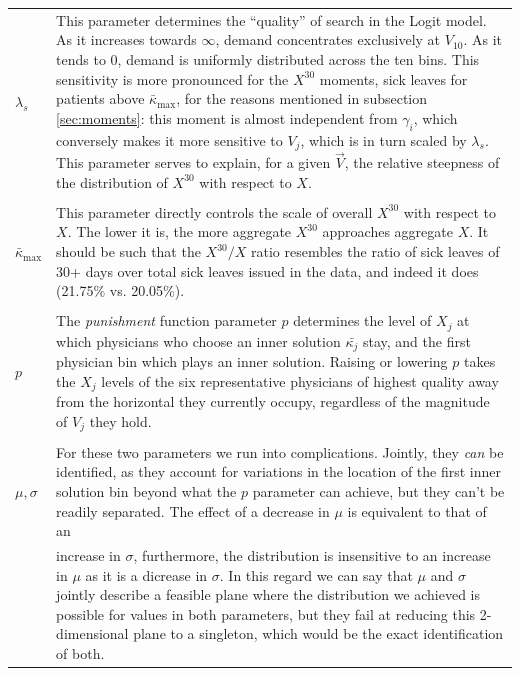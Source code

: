 \documentclass[../main.tex]{subfiles}
\begin{document}
\vspace{0.5em}
\begin{xltabular}{\textwidth}{lX}
  
  
    $\lambda_s$ & This parameter determines the ``quality'' of search in the Logit model. As it increases towards $\infty$, demand concentrates exclusively at $V_{10}$. As it tends to 0, demand is uniformly distributed across the ten bins. This sensitivity is more pronounced for the $X^{30}$ moments, sick leaves for patients above $\bar{\kappa}_{\max}$, for the reasons mentioned in subsection \ref{sec:moments}: this moment is almost independent from $\gamma_i$, which conversely makes it more sensitive to $V_j$, which is in turn scaled by  $\lambda_s$. This parameter serves to explain, for a given $\vec{V}$, the relative steepness of the distribution of $X^{30}$ with respect to $X$. \\
    \\
    $\bar{\kappa}_{\max}$ & This parameter directly controls the scale of overall $X^{30}$ with respect to $X$. The lower it is, the more aggregate $X^{30}$ approaches aggregate $X$. It should be such that the $X^{30}/X$ ratio resembles the ratio of sick leaves of 30+ days over total sick leaves issued in the data, and indeed it does (21.75\% vs. 20.05\%). \\
    \\
    $p$ & The \textit{punishment} function parameter $p$ determines the level of $X_j$ at which physicians who choose an inner solution $\bar{\kappa_j}$ stay, and the first physician bin which plays an inner solution. Raising or lowering $p$ takes the $X_j$ levels of the six representative physicians of highest quality away from the horizontal they currently occupy, regardless of the magnitude of $V_j$ they hold. \\
    \\
    $\mu, \sigma$ & For these two parameters we run into complications. Jointly, they \textit{can} be identified, as they account for variations in the location of the first inner solution bin beyond what the $p$ parameter can achieve, but they can't be readily separated. The effect of a decrease in $\mu$ is equivalent to that of an \\
    & increase in $\sigma$, furthermore, the distribution is insensitive to an increase in $\mu$ as it is a dicrease in $\sigma$. In this regard we can say that $\mu$ and $\sigma$ jointly describe a feasible plane where the distribution we achieved is possible for values in both parameters, but they fail at reducing this 2-dimensional plane to a singleton, which would be the exact identification of both.
\end{xltabular}
\end{document}
